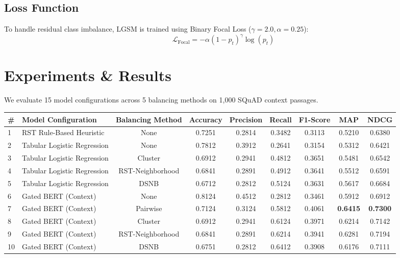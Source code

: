 \documentclass[11pt,a4paper,twocolumn]{article}
\begin{document}
\subsection{Loss Function}
To handle residual class imbalance, LGSM is trained using Binary Focal Loss ($\gamma = 2.0, \alpha = 0.25$):
\begin{equation}
    \mathcal{L}_{\text{Focal}} = -\alpha (1 - p_t)^\gamma \log(p_t)
\end{equation}

\section{Experiments \& Results}
We evaluate 15 model configurations across 5 balancing methods on 1,000 SQuAD context passages.

\begin{table}[t]
\centering
\small
\begin{tabular}{llccccccc}
\toprule
\textbf{\#} & \textbf{Model Configuration} & \textbf{Balancing Method} & \textbf{Accuracy} & \textbf{Precision} & \textbf{Recall} & \textbf{F1-Score} & \textbf{MAP} & \textbf{NDCG} \\
\midrule
1 & RST Rule-Based Heuristic & None & 0.7251 & 0.2814 & 0.3482 & 0.3113 & 0.5210 & 0.6380 \\
\midrule
2 & Tabular Logistic Regression & None & 0.7812 & 0.3912 & 0.2641 & 0.3154 & 0.5312 & 0.6421 \\
3 & Tabular Logistic Regression & Cluster & 0.6912 & 0.2941 & 0.4812 & 0.3651 & 0.5481 & 0.6542 \\
4 & Tabular Logistic Regression & RST-Neighborhood & 0.6841 & 0.2891 & 0.4912 & 0.3641 & 0.5512 & 0.6591 \\
5 & Tabular Logistic Regression & DSNB & 0.6712 & 0.2812 & 0.5124 & 0.3631 & 0.5617 & 0.6684 \\
\midrule
6 & Gated BERT (Context) & None & 0.8124 & 0.4512 & 0.2812 & 0.3461 & 0.5912 & 0.6912 \\
7 & Gated BERT (Context) & Pairwise & 0.7124 & 0.3124 & 0.5812 & 0.4061 & \textbf{0.6415} & \textbf{0.7300} \\
8 & Gated BERT (Context) & Cluster & 0.6912 & 0.2941 & 0.6124 & 0.3971 & 0.6214 & 0.7142 \\
9 & Gated BERT (Context) & RST-Neighborhood & 0.6841 & 0.2891 & 0.6214 & 0.3941 & 0.6281 & 0.7194 \\
10 & Gated BERT (Context) & DSNB & 0.6751 & 0.2812 & 0.6412 & 0.3908 & 0.6176 & 0.7111 \\

\end{tabular}
\end{table}
\end{document}
